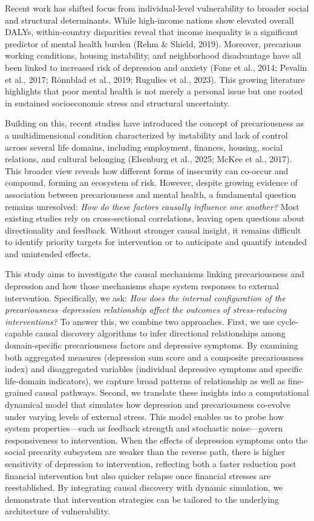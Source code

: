 \documentclass[
]{article}
\begin{document}
Recent work has shifted focus from individual-level vulnerability to
broader social and structural determinants. While high-income nations
show elevated overall DALYs, within-country disparities reveal that
income inequality is a significant predictor of mental health burden
(Rehm \& Shield, 2019). Moreover, precarious working conditions, housing
instability, and neighborhood disadvantage have all been linked to
increased risk of depression and anxiety (Fone et al., 2014; Pevalin et
al., 2017; Rönnblad et al., 2019; Rugulies et al., 2023). This growing
literature highlights that poor mental health is not merely a personal
issue but one rooted in sustained socioeconomic stress and structural
uncertainty.

Building on this, recent studies have introduced the concept of
precariousness as a multidimensional condition characterized by
instability and lack of control across several life domains, including
employment, finances, housing, social relations, and cultural belonging
(Elsenburg et al., 2025; McKee et al., 2017). This broader view reveals
how different forms of insecurity can co-occur and compound, forming an
ecosystem of risk. However, despite growing evidence of association
between precariousness and mental health, a fundamental question remains
unresolved: \emph{How do these factors causally influence one another?}
Most existing studies rely on cross-sectional correlations, leaving open
questions about directionality and feedback. Without stronger causal
insight, it remains difficult to identify priority targets for
intervention or to anticipate and quantify intended and unintended
effects.

This study aims to investigate the causal mechanisms linking
precariousness and depression and how those mechanisms shape system
responses to external intervention. Specifically, we ask: \emph{How does
the internal configuration of the precariousness--depression
relationship affect the outcomes of stress-reducing interventions?} To
answer this, we combine two approaches. First, we use cycle-capable
causal discovery algorithms to infer directional relationships among
domain-specific precariousness factors and depressive symptoms. By
examining both aggregated measures (depression sum score and a composite
precariousness index) and disaggregated variables (individual depressive
symptoms and specific life-domain indicators), we capture broad patterns
of relationship as well as fine-grained causal pathways. Second, we
translate these insights into a computational dynamical model that
simulates how depression and precariousness co-evolve under varying
levels of external stress. This model enables us to probe how system
properties---such as feedback strength and stochastic noise---govern
responsiveness to intervention. When the effects of depression symptoms
onto the social precarity subsystem are weaker than the reverse path,
there is higher sensitivity of depression to intervention, reflecting
both a faster reduction post financial intervention but also quicker
relapse once financial stresses are reestablished. By integrating causal
discovery with dynamic simulation, we demonstrate that intervention
strategies can be tailored to the underlying architecture of
vulnerability.
\end{document}
